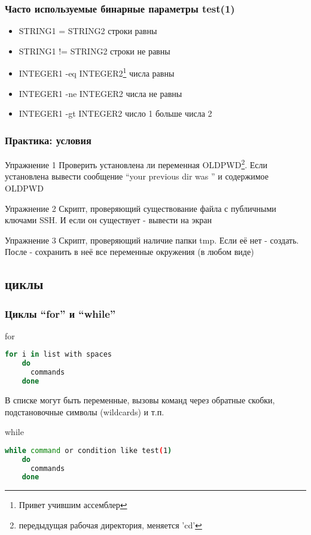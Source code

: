 \begin{frame}[fragile]
  \frametitle{Часто используемые бинарные параметры test(1)}
  \begin{itemize}
    \item \alert{STRING1 = STRING2} строки равны
    \item \alert{STRING1 != STRING2} строки не равны
    \item \alert{INTEGER1 -eq INTEGER2}\footnote{Привет учившим ассемблер} числа равны
    \item \alert{INTEGER1 -ne INTEGER2} числа не равны
    \item \alert{INTEGER1 -gt INTEGER2} число 1 больше числа 2
  \end{itemize}
\end{frame}

\begin{frame}[fragile]
  \frametitle{Практика: условия}

  \alert{Упражнение 1} Проверить установлена ли переменная OLDPWD\footnote{передыдущая рабочая директория, меняется 'cd'}. Если установлена вывести сообщение ``your previous dir was '' и содержимое OLDPWD \pause

  \alert{Упражнение 2} Скрипт, проверяющий существование файла с публичными ключами SSH. И если он существует - вывести на экран  \pause

  \alert{Упражнение 3} Скрипт, проверяющий наличие папки tmp. Если её нет - создать. После - сохранить в неё все переменные окружения (в любом виде)
\end{frame}

\subsection{циклы}

\begin{frame}[fragile]
  \frametitle{Циклы ``for'' и ``while''}
      \alert{for}
      \begin{lstlisting}[language=sh,frame=single,basicstyle=\normalsize,breaklines=true]
	for i in list with spaces
	do
	  commands
	done
      \end{lstlisting}
      В списке могут быть переменные, вызовы команд через обратные скобки, подстановочные символы (wildcards) и т.п.\pause
  
      \alert{while}
      \begin{lstlisting}[language=sh,frame=single,basicstyle=\normalsize,breaklines=true]
	while command or condition like test(1)
	do
	  commands
	done
      \end{lstlisting} 
\end{frame}

